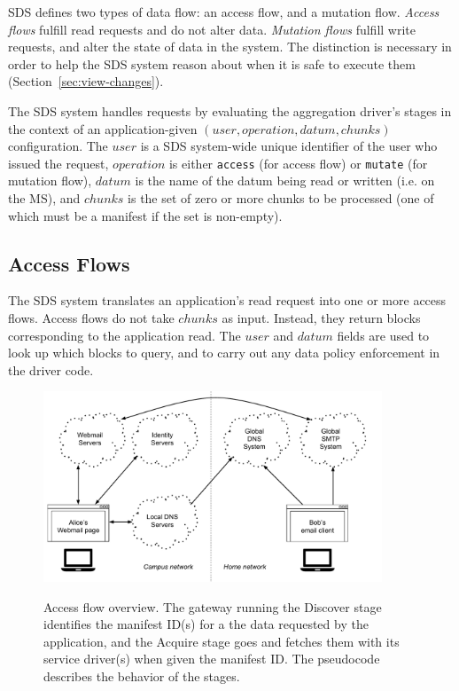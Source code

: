 SDS defines two types of data flow:  an access flow, and a mutation flow.
\emph{Access flows} fulfill read requests and do not alter data.  
\emph{Mutation flows} fulfill write requests, and alter
the state of data in the system.  The distinction is necessary in order to help
the SDS system reason about when it is safe to execute them
(Section~\ref{sec:view-changes}).

The SDS system handles requests by evaluating the aggregation driver's stages in the context of
an application-given $(user, operation, datum, chunks)$ configuration.  The
$user$ is a SDS system-wide unique identifier of the user who issued the request,
$operation$ is either \texttt{access} (for access flow) or \texttt{mutate} (for
mutation flow), $datum$ is the name of the datum being read or written (i.e. on
the MS), and $chunks$ is the set of zero or more chunks to be processed (one of which must be
a manifest if the set is non-empty).

\subsection{Access Flows}

The SDS system translates an application's read request into one or more access
flows.  Access flows do not take $chunks$ as input.  Instead, they return blocks
corresponding to the application read.  The $user$ and $datum$ fields are used
to look up which blocks to query, and to carry out any data policy enforcement
in the driver code.

\begin{figure}[h]
   \caption{Access flow overview.  The gateway running the Discover stage
   identifies the manifest ID(s) for a the data requested by the application,
   and the Acquire stage goes and fetches them with its service driver(s)
   when given the manifest ID.  The pseudocode describes the behavior of the
   stages.}
   \centering
   \includegraphics[width=0.9\textwidth,page=7]{figures/dissertation-figures}
   \label{fig:chap2-access-flow}
\end{figure}

